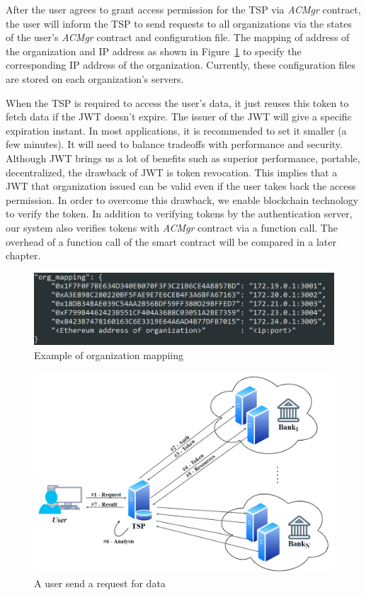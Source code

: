After the user agrees to grant access permission for the TSP via \textit{ACMgr} contract, the user will inform the TSP to send requests to all organizations via the states of the user's \textit{ACMgr} contract and configuration file. The mapping of address of the organization and IP address as shown in Figure~\ref{fig:mappingExample} to specify the corresponding IP address of the organization. Currently, these configuration files are stored on each organization's servers. \par
When the TSP is required to access the user's data, it just reuses this token to fetch data if the JWT doesn't expire. The issuer of the JWT will give a specific expiration instant. In most applications, it is recommended to set it smaller (a few minutes). It will need to balance tradeoffs with performance and security. Although JWT brings us a lot of benefits such as superior performance, portable, decentralized, the drawback of JWT is token revocation. This implies that a JWT that organization issued can be valid even if the user takes back the access permission. In order to overcome this drawback, we enable blockchain technology to verify the token. In addition to verifying tokens by the authentication server, our system also verifies tokens with \textit{ACMgr} contract via a function call. The overhead of a function call of the smart contract will be compared in a later chapter.\par
\begin{figure}[htb]
    \centering
    \includegraphics[height=!,width=0.9\linewidth,keepaspectratio=true]{figures/mapping_example.png}
    \caption{{\footnotesize Example of organization mappiing}}
    \label{fig:mappingExample}
\end{figure}
\newpage
\begin{figure}[htb]
    \centering
    \includegraphics[height=!,width=1\linewidth,keepaspectratio=true]{figures/jwt_flow.png}
    \caption{{\footnotesize A user send a request for data}}
    \label{fig:jwt_flow}
\end{figure}

